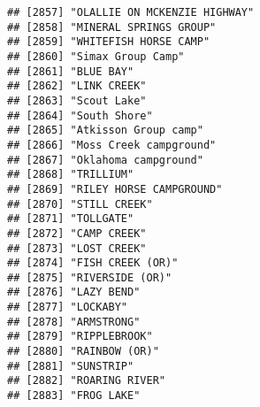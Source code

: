\documentclass[
]{article}
\begin{document}
\begin{verbatim}
## [2857] "OLALLIE ON MCKENZIE HIGHWAY"                                                         
## [2858] "MINERAL SPRINGS GROUP"                                                               
## [2859] "WHITEFISH HORSE CAMP"                                                                
## [2860] "Simax Group Camp"                                                                    
## [2861] "BLUE BAY"                                                                            
## [2862] "LINK CREEK"                                                                          
## [2863] "Scout Lake"                                                                          
## [2864] "South Shore"                                                                         
## [2865] "Atkisson Group camp"                                                                 
## [2866] "Moss Creek campground"                                                               
## [2867] "Oklahoma campground"                                                                 
## [2868] "TRILLIUM"                                                                            
## [2869] "RILEY HORSE CAMPGROUND"                                                              
## [2870] "STILL CREEK"                                                                         
## [2871] "TOLLGATE"                                                                            
## [2872] "CAMP CREEK"                                                                          
## [2873] "LOST CREEK"                                                                          
## [2874] "FISH CREEK (OR)"                                                                     
## [2875] "RIVERSIDE (OR)"                                                                      
## [2876] "LAZY BEND"                                                                           
## [2877] "LOCKABY"                                                                             
## [2878] "ARMSTRONG"                                                                           
## [2879] "RIPPLEBROOK"                                                                         
## [2880] "RAINBOW (OR)"                                                                        
## [2881] "SUNSTRIP"                                                                            
## [2882] "ROARING RIVER"                                                                       
## [2883] "FROG LAKE"                                                                           

\end{verbatim}
\end{document}
